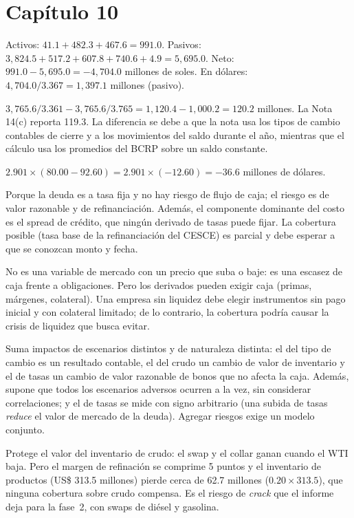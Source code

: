 \section*{Capítulo 10}

 Activos: $41.1+482.3+467.6=991.0$. Pasivos: $3{,}824.5+517.2+607.8+740.6+4.9=5{,}695.0$. Neto: $991.0-5{,}695.0=-4{,}704.0$ millones de soles. En dólares: $4{,}704.0/3.367=1{,}397.1$ millones (pasivo).

 $3{,}765.6/3.361-3{,}765.6/3.765=1{,}120.4-1{,}000.2=120.2$ millones. La Nota 14(c) reporta 119.3. La diferencia se debe a que la nota usa los tipos de cambio contables de cierre y a los movimientos del saldo durante el año, mientras que el cálculo usa los promedios del BCRP sobre un saldo constante.

 $2.901\times(80.00-92.60)=2.901\times(-12.60)=-36.6$ millones de dólares.

 Porque la deuda es a tasa fija y no hay riesgo de flujo de caja; el riesgo es de valor razonable y de refinanciación. Además, el componente dominante del costo es el spread de crédito, que ningún derivado de tasas puede fijar. La cobertura posible (tasa base de la refinanciación del CESCE) es parcial y debe esperar a que se conozcan monto y fecha.

 No es una variable de mercado con un precio que suba o baje: es una escasez de caja frente a obligaciones. Pero los derivados pueden exigir caja (primas, márgenes, colateral). Una empresa sin liquidez debe elegir instrumentos sin pago inicial y con colateral limitado; de lo contrario, la cobertura podría causar la crisis de liquidez que busca evitar.

 Suma impactos de escenarios distintos y de naturaleza distinta: el del tipo de cambio es un resultado contable, el del crudo un cambio de valor de inventario y el de tasas un cambio de valor razonable de bonos que no afecta la caja. Además, supone que todos los escenarios adversos ocurren a la vez, sin considerar correlaciones; y el de tasas se mide con signo arbitrario (una subida de tasas \emph{reduce} el valor de mercado de la deuda). Agregar riesgos exige un modelo conjunto.

 Protege el valor del inventario de crudo: el swap y el collar ganan cuando el WTI baja. Pero el margen de refinación se comprime 5 puntos y el inventario de productos (US\$ 313.5 millones) pierde cerca de 62.7 millones ($0.20\times313.5$), que ninguna cobertura sobre crudo compensa. Es el riesgo de \emph{crack} que el informe deja para la fase~2, con swaps de diésel y gasolina.
